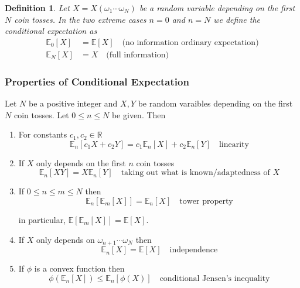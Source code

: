 \documentclass[12pt]{article}
\newtheorem{definition}{Definition}
\newcommand{\R}{\mathbb R}
\newcommand{\E}{\mathbb E}
\begin{document}
\begin{definition} Let $X = X(\omega_1\cdots\omega_N)$ be a random variable depending on the first $N$ coin tosses. In the two extreme cases $n = 0$ and $n = N$ we define the conditional expectation as
\begin{align*}
	\E_0[X] &= \E[X] \quad \text{(no information ordinary expectation)} \\
	\E_N[X] &= X \quad \text{(full information)}
\end{align*}
\end{definition}

\subsubsection{Properties of Conditional Expectation}

Let $N$ be a positive integer and $X, Y$ be random varaibles depending on the first $N$ coin tosses. Let $0 \leq n \leq N$ be given. Then

\begin{enumerate}
	\item For constants $c_1, c_2 \in \R$
	\begin{equation*}
		\E_n[c_1X + c_2Y] = c_1\E_n[X] + c_2\E_n[Y] \quad \text{linearity}
	\end{equation*}
	\item If $X$ only depends on the first $n$ coin tosses
	\begin{equation*}
		\E_n[XY] = X\E_n[Y] \quad \text{taking out what is known/adaptedness of $X$}
	\end{equation*}
	\item If $0 \leq n \leq m \leq N$ then
	\begin{equation*}
		\E_n[\E_m[X]] = \E_n[X] \quad \text{tower property}
	\end{equation*}
	
	in particular, $\E[\E_m[X]] = \E[X]$.
	\item If $X$ only depends on $\omega_{n + 1}\cdots\omega_N$ then
	\begin{equation*}
		\E_n[X] = \E[X] \quad \text{independence}
	\end{equation*}
	\item If $\phi$ is a convex function then
		\begin{equation*}
		\phi(\E_n[X]) \leq \E_n[\phi(X)] \quad \text{conditional Jensen's inequality}
	\end{equation*}
\end{enumerate}
\end{document}
